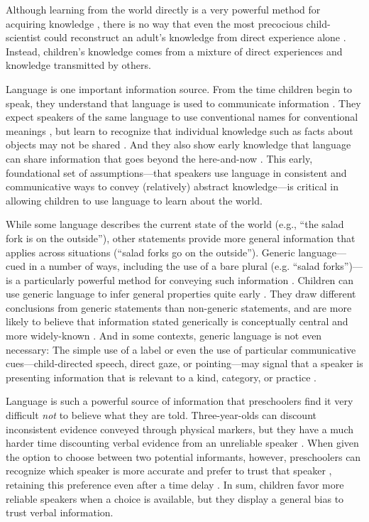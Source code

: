 \documentclass[man]{apa2}
\begin{document}
Although learning from the world directly is a very powerful method for acquiring knowledge \cite{gopnik2012b}, there is no way that even the most precocious child-scientist could reconstruct an adult's knowledge from direct experience alone \cite{shafto2012,harris2012}. Instead, children's knowledge comes from a mixture of direct experiences and knowledge transmitted by others. 

Language is one important information source. From the time children begin to speak, they understand that language is used to communicate information \cite{vouloumanos2012}. They expect speakers of the same language to use conventional names for conventional meanings \cite{clark1987, diesendruck2005}, but learn to recognize that individual knowledge such as facts about objects may not be shared \cite{diesendruck2001}. And they also show early knowledge that language can share information that goes beyond the here-and-now \cite{saylor2007,ganea2007}. This early, foundational set of assumptions---that speakers use language in consistent and communicative ways to convey (relatively) abstract knowledge---is critical in allowing children to use language to learn about the world. 

While some language describes the current state of the world (e.g., ``the salad fork is on the outside''), other statements provide more general information that applies across situations (``salad forks go on the outside''). Generic language---cued in a number of ways, including the use of a bare plural (e.g. ``salad forks'')---is a particularly powerful method for conveying such information \cite{leslie2008}. Children can use generic language to infer general properties quite early \cite{gelman2003}. They draw different conclusions from generic statements than non-generic statements, and are more likely to believe that information stated generically is conceptually central and more widely-known \cite{cimpian2009, cimpian2012}. And in some contexts, generic language is not even necessary: The simple use of a label or even the use of particular communicative cues---child-directed speech, direct gaze, or pointing---may signal that a speaker is presenting information that is relevant to a kind, category, or practice \cite{csibra2009, butler2012}. 

Language is such a powerful source of information that preschoolers find it very difficult \emph{not} to believe what they are told.  Three-year-olds can discount inconsistent evidence conveyed through physical markers, but they have a much harder time discounting verbal evidence from an unreliable speaker \cite{jaswal2010}.  When given the option to choose between two potential informants, however, preschoolers can recognize which speaker is more accurate and prefer to trust that speaker \cite{pasquini2007}, retaining this preference even after a time delay \cite{corriveau2009}.  In sum, children favor more reliable speakers when a choice is available, but they display a general bias to trust verbal information.
\end{document}
